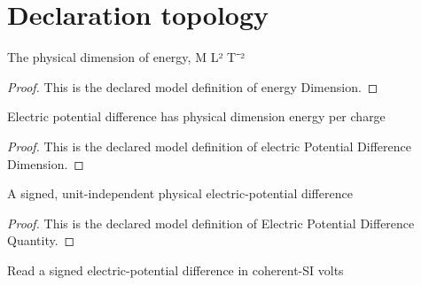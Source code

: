 \section{Declaration topology}
\begin{definition}
  \label{def:physics:phyx-mini-0872:phyxminiproblems-problemphyxmini0872-energydimension}
  The physical dimension of energy, M L² T⁻²
\end{definition}
\begin{proof}
  This is the declared model definition of energy Dimension.
\end{proof}
\begin{definition}
  \label{def:physics:phyx-mini-0872:phyxminiproblems-problemphyxmini0872-electricpotentialdifferencedimension}
  Electric potential difference has physical dimension energy per charge
\end{definition}
\begin{proof}
  This is the declared model definition of electric Potential Difference Dimension.
\end{proof}
\begin{definition}
  \label{def:physics:phyx-mini-0872:phyxminiproblems-problemphyxmini0872-electricpotentialdifferencequantity}
  A signed, unit-independent physical electric-potential difference
\end{definition}
\begin{proof}
  This is the declared model definition of Electric Potential Difference Quantity.
\end{proof}
\begin{definition}
  \label{def:physics:phyx-mini-0872:phyxminiproblems-problemphyxmini0872-potentialdifferenceinvolts}
  Read a signed electric-potential difference in coherent-SI volts
\end{definition}
